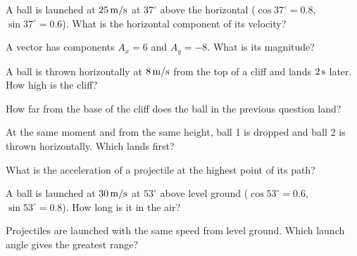 \begin{exo}{}
A ball is launched at $25\ms$ at $37^\circ$ above the horizontal ($\cos37^\circ=0.8$, $\sin37^\circ=0.6$). What is the horizontal component of its velocity?
\choices{$15\ms$}{$20\ms$}{$25\ms$}{$12.5\ms$}
\end{exo}
\begin{exo}{}
A vector has components $A_x=6$ and $A_y=-8$. What is its magnitude?
\end{exo}
\begin{exo}{}
A ball is thrown horizontally at $8\,\mathrm{m/s}$ from the top of a cliff and lands $2\,\mathrm{s}$ later. How high is the cliff?
\choices{$20\m$}{$16\m$}{$10\m$}{$40\m$}
\end{exo}
\begin{exo}{}
How far from the base of the cliff does the ball in the previous question land?
\choices{$8\m$}{$4\m$}{$32\m$}{$16\m$}
\end{exo}
\begin{exo}{}
At the same moment and from the same height, ball 1 is dropped and ball 2 is thrown horizontally. Which lands first?
\end{exo}
\begin{exo}{}
What is the acceleration of a projectile at the highest point of its path?
\end{exo}
\begin{exo}{}
A ball is launched at $30\,\mathrm{m/s}$ at $53^\circ$ above level ground ($\cos53^\circ=0.6$, $\sin53^\circ=0.8$). How long is it in the air?
\choices{$2.4\s$}{$4.8\s$}{$3\s$}{$6\s$}
\end{exo}
\begin{exo}{}
Projectiles are launched with the same speed from level ground. Which launch angle gives the greatest range?
\end{exo}
